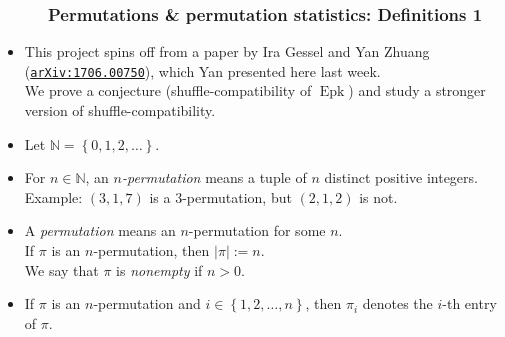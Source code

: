 \documentclass{beamer}
\newcommand{\red}{\color{red}}
\newcommand{\NN}{{\mathbb N}}
\newcommand{\Epk}{\operatorname{Epk}}
\newcommand\arxiv[1]{\href{http://www.arxiv.org/abs/#1}{\texttt{arXiv:#1}}}
\newcommand{\fti}[1]{\frametitle{\ \ \ \ \ #1}}
\newcommand{\set}[1]{\left\{ #1 \right\}}
\newcommand{\abs}[1]{\left| #1 \right|}
\newcommand{\tup}[1]{\left( #1 \right)}
\newcommand{\defn}[1]{{\color{darkred}\emph{#1}}} %
\theoremstyle{plain}
\begin{document}
\begin{frame}
\fti{Permutations \& permutation statistics: Definitions 1}

\begin{itemize}

\item This project spins off from a paper by Ira Gessel and Yan Zhuang
({\red \arxiv{1706.00750}}),
which Yan presented here last week. \\
We prove a conjecture (shuffle-compatibility of $\Epk$)
and study a stronger version of shuffle-compatibility.

\pause

\item Let $\NN = \set{0, 1, 2, \ldots}$.

\item For $n \in \NN$, an \defn{$n$-permutation} means a tuple of $n$
distinct positive integers. \\
Example: $\tup{3, 1, 7}$ is a $3$-permutation, but
         $\tup{2, 1, 2}$ is not.

\pause

\item A \defn{permutation} means an $n$-permutation for some $n$. \\ \pause
      If $\pi$ is an $n$-permutation, then \defn{$\abs{\pi} := n$}. \\ \pause
      We say that $\pi$ is \defn{nonempty} if $n > 0$.

\pause

\item If $\pi$ is an $n$-permutation and $i \in \set{1, 2, \ldots, n}$,
      then \defn{$\pi_i$} denotes the $i$-th entry of $\pi$.

\end{itemize}
\end{frame}
\end{document}
